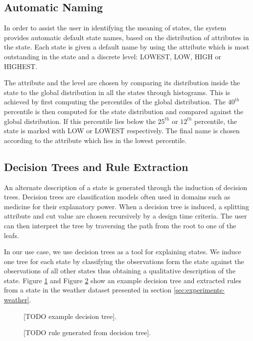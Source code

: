 \subsection{Automatic Naming}

In order to assist the user in identifying the meaning of states, the system provides automatic default
state names, based on the distribution of attributes in the state. Each state is given a default name
by using the attribute which is most outstanding in the state and a discrete level: LOWEST, LOW, HIGH or
HIGHEST.

The attribute and the level are chosen by comparing its distribution inside the state to the global
distribution in all the states through histograms. This is achieved by first computing the percentiles
of the global distribution. The $40^{th}$ percentile is then computed for the state distribution and
compared against the global distribution. If this percentile lies below the $25^{th}$ or $12^{th}$
percentile, the state is marked with LOW or LOWEST respectively. The final name is chosen according
to the attribute which lies in the lowest percentile.


\subsection{Decision Trees and Rule Extraction}

An alternate description of a state is generated through the induction of decision trees. Decision
trees are classification models often used in domains such as medicine for their explanatory power.
When a decision tree is induced, a splitting attribute and cut value are chosen recursively by a
design time criteria. The user can then interpret the tree by traversing the path from the root 
to one of the leafs.

In our use case, we use decision trees as a tool for explaining states. We induce one tree for each
state by classifying the observations form the state against the observations of all other states
thus obtaining a qualitative description of the state. Figure \ref{fig:example-decision-tree} and
Figure \ref{fig:example-decision-tree-rule} show an example decision tree and extracted rules
from a state in the weather dataset presented in section \ref{sec:experiments-weather}.

\begin{figure}[h!]
	\centering
	\caption{[TODO example decision tree].}
	\label{fig:example-decision-tree}
\end{figure}

\begin{figure}[h!]
	\centering
	\caption{[TODO rule generated from decision tree].}
	\label{fig:example-decision-tree-rule}
\end{figure}